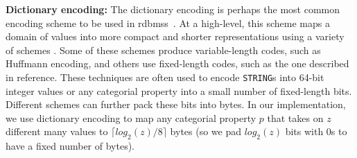 \noindent \textbf{Dictionary encoding:} The dictionary encoding is perhaps the most common encoding scheme to be used in \gls{rdbms}s~\cite{abadi-col-comp, boncz-comp}. At a high-level, this scheme maps a domain of values into more compact and shorter representations using a variety of schemes \cite{boncz-comp, dat-comp, abadi-col-comp}. Some of these schemes produce variable-length codes, such as Huffmann encoding, and others use fixed-length codes, such as the one described in reference\cite{abadi-col-comp}. These techniques are often used to encode \texttt{STRING}s into 64-bit integer values or any categorial property into a small number of fixed-length bits. Different schemes can further pack these bits into bytes. In our implementation, we use dictionary encoding to map any categorial property $p$ that takes on $z$ different many values to  $\lceil log_2(z)/8 \rceil$ bytes (so we pad $log_2(z)$ bits with 0s to have a fixed number of bytes).
	
	
